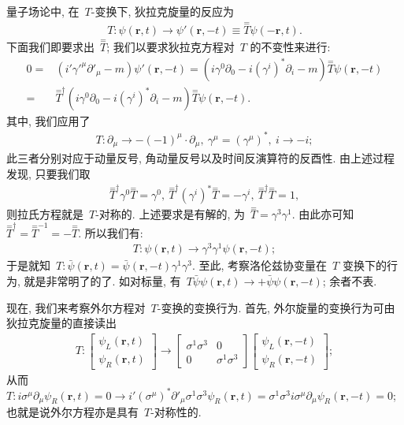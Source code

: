 量子场论中, 在~$T$-变换下, 狄拉克旋量的反应为
\begin{align}
T: \psi(\bm{r},t)\rightarrow\psi'(\bm{r},-t)\equiv\overset{=}{T}\psi(-\bm{r},t).
\end{align}
下面我们即要求出~$\overset{=}{T}$; 我们以要求狄拉克方程对~$T$ 的不变性来进行:
\begin{align}
0=&(i'\gamma'^\mu\partial'_\mu-m)\psi'(\bm{r},-t)=(i\gamma^0\partial_0-i(\gamma^i)^*\partial_i-m)\overset{=}{T}\psi(\bm{r},-t)\nonumber\\
=&\overset{=}{T}^\dag(i\gamma^0\partial_0-i(\gamma^i)^*\partial_i-m)\overset{=}{T}\psi(\bm{r},-t).
\end{align}
其中, 我们应用了
\begin{align}
T:\partial_\mu\rightarrow-(-1)^\mu\cdot\partial_\mu,~\gamma^\mu=(\gamma^\mu)^*,~i\rightarrow-i;
\end{align}
此三者分别对应于动量反号, 角动量反号以及时间反演算符的反酉性. 由上述过程发现, 只要我们取
\begin{align}
\overset{=}{T}^\dag\gamma^0\overset{=}{T}=\gamma^0,~\overset{=}{T}^\dag(\gamma^i)^*\overset{=}{T}=-\gamma^i,~\overset{=}{T}^\dag\overset{=}{T}=1,
\end{align}
则拉氏方程就是~$T$-对称的. 上述要求是有解的, 为~$\overset{=}{T}=\gamma^3\gamma^1$. 由此亦可知~$\overset{=}{T}^\dag=\overset{=}{T}^{-1}=-\overset{=}{T}$. 所以我们有:
\begin{align}
T:\psi(\bm{r},t)\rightarrow\gamma^3\gamma^1\psi(\bm{r},-t);
\end{align}
于是就知~$T:\bar{\psi}(\bm{r},t)=\bar{\psi}(\bm{r},-t)\gamma^1\gamma^3$. 至此, 考察洛伦兹协变量在~$T$ 变换下的行为, 就是非常明了的了. 如对标量, 有~$T\bar{\psi}\psi(\bm{r},t)\rightarrow+\bar{\psi}\psi(\bm{r},-t)$; 余者不表.

现在, 我们来考察外尔方程对~$T$-变换的变换行为. 首先, 外尔旋量的变换行为可由狄拉克旋量的直接读出
\begin{align}
T:\left[\begin{array}{c}\psi_L(\bm{r},t)\\\psi_R(\bm{r},t)\end{array}\right]\rightarrow\left[\begin{array}{cc}\sigma^1\sigma^3&0\\0&\sigma^1\sigma^3\end{array}\right]
\left[\begin{array}{c}\psi_L(\bm{r},-t)\\\psi_R(\bm{r},-t)\end{array}\right];
\end{align}
从而~$T:i\sigma^\mu\partial_\mu\psi_R(\bm{r},t)=0\rightarrow i'(\sigma^\mu)^*\partial'_\mu\sigma^1\sigma^3\psi_R(\bm{r},t)=\sigma^1\sigma^3i\sigma^\mu\partial_\mu\psi_R(\bm{r},-t)=0$; 也就是说外尔方程亦是具有~$T$-对称性的.

